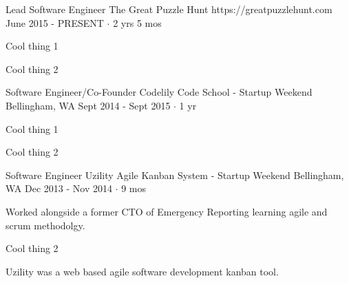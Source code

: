 \documentclass[11pt, a4paper]{awesome-cv}
\begin{document}
\begin{cventries}

  \cventry
    {Lead Software Engineer} %
    {The Great Puzzle Hunt} %
    {https://greatpuzzlehunt.com} %
    {June 2015 - PRESENT $\cdot$ 2 yrs 5 mos} %
    {
      \begin{cvitems} %
        \item Cool thing 1
        \item Cool thing 2
      \end{cvitems}
    }
    {}

  \cventry
    {Software Engineer/Co-Founder} %
    {Codelily Code School - Startup Weekend} %
    {Bellingham, WA} %
    {Sept 2014 - Sept 2015 $\cdot$ 1 yr} %
    {
      \begin{cvitems} %
        \item Cool thing 1
        \item Cool thing 2
      \end{cvitems}
    }
    {}

  \cventry
    {Software Engineer} %
    {Uzility Agile Kanban System - Startup Weekend} %
    {Bellingham, WA} %
    {Dec 2013 - Nov 2014 $\cdot$ 9 mos} %
    {
      \begin{cvitems} %
        \item Worked alongside a former CTO of Emergency Reporting learning agile and scrum methodolgy.
        \item Cool thing 2
      \end{cvitems}
    }
    {Uzility was a web based agile software development kanban tool.}
\end{cventries}
\end{document}
